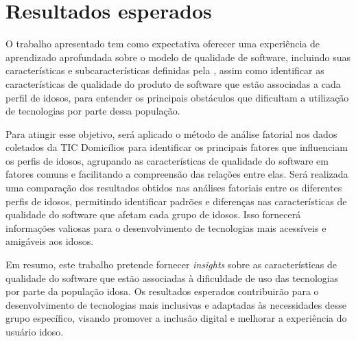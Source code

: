\chapter[Resultados esperados]{Resultados esperados}

O trabalho apresentado tem como expectativa oferecer uma experiência de aprendizado aprofundada sobre o modelo de qualidade de software, incluindo suas características e subcaracterísticas definidas pela , assim como identificar as características de qualidade do produto de software que estão associadas a cada perfil de idosos, para entender os principais obstáculos que dificultam a utilização de tecnologias por parte dessa população.

Para atingir esse objetivo, será aplicado o método de análise fatorial nos dados coletados da TIC Domicílios para identificar os principais fatores que influenciam os perfis de idosos, agrupando as características de qualidade do software em fatores comuns e facilitando a compreensão das relações entre elas. Será realizada uma comparação dos resultados obtidos nas análises fatoriais entre os diferentes perfis de idosos, permitindo identificar padrões e diferenças nas características de qualidade do software que afetam cada grupo de idosos. Isso fornecerá informações valiosas para o desenvolvimento de tecnologias mais acessíveis e amigáveis aos idosos.

Em resumo, este trabalho pretende fornecer \textit{insights} sobre as características de qualidade do software que estão associadas à dificuldade de uso das tecnologias por parte da população idosa. Os resultados esperados contribuirão para o desenvolvimento de tecnologias mais inclusivas e adaptadas às necessidades desse grupo específico, visando promover a inclusão digital e melhorar a experiência do usuário idoso.